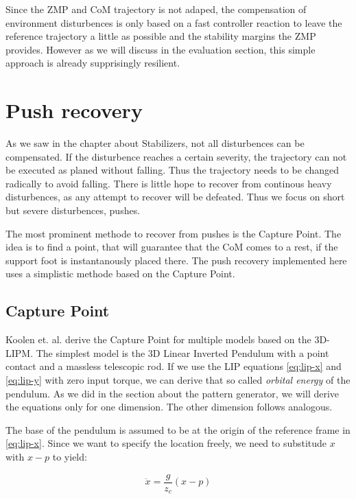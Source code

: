 \documentclass[english,ngerman]{KITreprt}
\begin{document}
Since the ZMP and CoM trajectory is not adaped, the compensation of
environment disturbences is only based on a fast controller reaction to
leave the reference trajectory a little as possible and the stability
margins the ZMP provides. However as we will discuss in the evaluation
section, this simple approach is already supprisingly resilient.

\chapter{Push recovery}\label{push-recovery}

As we saw in the chapter about Stabilizers, not all disturbences can be
compensated. If the disturbence reaches a certain severity, the
trajectory can not be executed as planed without falling. Thus the
trajectory needs to be changed radically to avoid falling. There is
little hope to recover from continous heavy disturbences, as any attempt
to recover will be defeated. Thus we focus on short but severe
disturbences, pushes.

The most prominent methode to recover from pushes is the Capture Point.
The idea is to find a point, that will guarantee that the CoM comes to a
rest, if the support foot is instantanously placed there. The push
recovery implemented here uses a simplistic methode based on the Capture
Point.

\section{Capture Point}\label{capture-point}

Koolen et. al. \cite{koolen2012capturability} derive the Capture Point
for multiple models based on the 3D-LIPM. The simplest model is the 3D
Linear Inverted Pendulum with a point contact and a massless telescopic
rod. If we use the LIP equations \ref{eq:lip-x} and \ref{eq:lip-y} with
zero input torque, we can derive that so called \emph{orbital energy} of
the pendulum. As we did in the section about the pattern generator, we
will derive the equations only for one dimension. The other dimension
follows analogous.

The base of the pendulum is assumed to be at the origin of the reference
frame in \ref{eq:lip-x}. Since we want to specify the location freely,
we need to substitude $x$ with $x - p$ to yield:

\begin{equation} \label{eq:lip-x-general}
\ddot{x} = \frac{g}{z_c} (x - p)
\end{equation}
\end{document}
